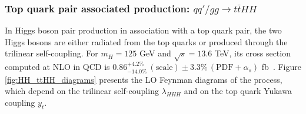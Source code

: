 


\subsubsection{Top quark pair associated production: $qq'/gg\rightarrow t\bar{t}HH$}
%
In Higgs boson pair production in association with a top quark pair, the two Higgs bosons are either radiated from the top quarks or produced through the trilinear self-coupling. For $m_H = 125$ GeV and $\sqrt{s} = 13.6$ TeV, its cross section computed at NLO in QCD is $0.86^{+4.2\%}_{-14.0\%}\,(\text{scale}) \pm 3.3\%\,(\text{PDF}+\alpha_s)$ fb~\cite{Frederix:2014hta,LHCHWG:HHlegacy}. Figure \ref{fig:HH_ttHH_diagrams} presents the LO Feynman diagrams of the process, which depend on the trilinear self-coupling $\lambda_{HHH}$ and on the top quark Yukawa coupling $y_t$.
%
